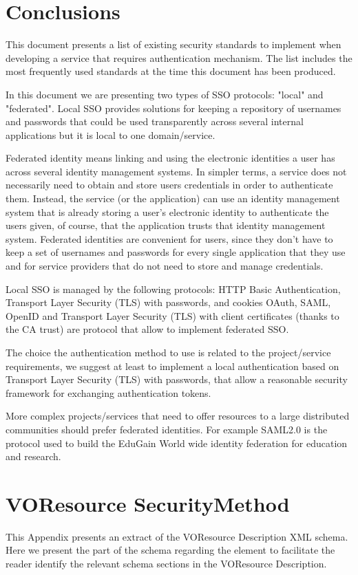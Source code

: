 \documentclass[11pt,a4paper]{ivoa}
\begin{document}
\section{Conclusions}
This document presents a list of existing security standards to implement when developing a service that requires authentication mechanism. The list includes the most frequently used standards at the time this document has been produced. 

In this document we are presenting two types of  SSO protocols: "local" and "federated". 
Local SSO  provides solutions for keeping a repository of usernames and passwords 
that could be used transparently across several internal applications but it is local to one domain/service.

Federated identity means linking and using the electronic identities a user has across several identity management systems.
In simpler terms, a service does not necessarily need to obtain and store users credentials in order to authenticate them. Instead, the service (or the application) can use an identity management system that is already storing a user's electronic identity 
to authenticate the users given, of course, that the application trusts that identity management system.
Federated identities are convenient for users, since they don't have to keep a set of usernames and passwords for every single application that they use and for service providers that do not need to store and manage credentials.

Local SSO is managed by  the following protocols: HTTP Basic Authentication,  Transport Layer Security (TLS) with passwords, and cookies
OAuth, SAML, OpenID and Transport Layer Security (TLS) with client certificates (thanks to the CA trust) are protocol that 
allow to implement  federated SSO. 

The choice the authentication method to use is related to the project/service requirements, we suggest at least to implement 
a local authentication based on Transport Layer Security (TLS) with passwords, that allow a reasonable security 
framework for exchanging authentication tokens. 

More complex projects/services that need to offer resources to a large distributed communities should prefer federated identities. 
For example SAML2.0 is the protocol used to build the EduGain World wide identity federation  for education and research.



\appendix 
\section{VOResource  SecurityMethod}
This Appendix presents an extract of the VOResource Description XML schema.
Here we present the part of the schema regarding the    element 
to facilitate the reader identify the relevant schema sections in the VOResource Description. 
\end{document}
